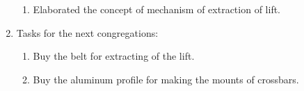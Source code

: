 \begin{enumerate}
\begin{enumerate}
      \item Elaborated the concept of mechanism of extraction of lift.
      
    \end{enumerate}
    
	\item Tasks for the next congregations:
	\begin{enumerate}
	  \item Buy the belt for extracting of the lift.
	  
	  \item Buy the aluminum profile for making the mounts of crossbars.
	  
    \end{enumerate}     
\end{enumerate}
\fillpage
